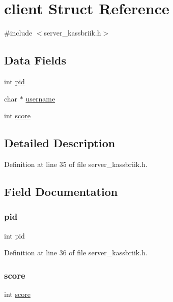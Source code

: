 \hypertarget{structclient}{}\section{client Struct Reference}
\label{structclient}


{\ttfamily \#include $<$server\+\_\+kassbriik.\+h$>$}

\subsection*{Data Fields}
\begin{DoxyCompactItemize}
\item 
int \hyperlink{structclient_af500917c052066b40cf47f96b43c607b}{pid}
\item 
char $\ast$ \hyperlink{structclient_a9b20c006bd90a09e1465fb668700e81d}{username}
\item 
int \hyperlink{structclient_aef160b7437d94056f1dc59646cd5b87d}{score}
\end{DoxyCompactItemize}


\subsection{Detailed Description}


Definition at line 35 of file server\+\_\+kassbriik.\+h.



\subsection{Field Documentation}
\mbox{\label{structclient_af500917c052066b40cf47f96b43c607b}} 
\subsubsection{\texorpdfstring{pid}{pid}}
{\footnotesize\ttfamily int pid}



Definition at line 36 of file server\+\_\+kassbriik.\+h.

\mbox{\label{structclient_aef160b7437d94056f1dc59646cd5b87d}} 
\subsubsection{\texorpdfstring{score}{score}}
{\footnotesize\ttfamily int \hyperlink{structscore}{score}}



